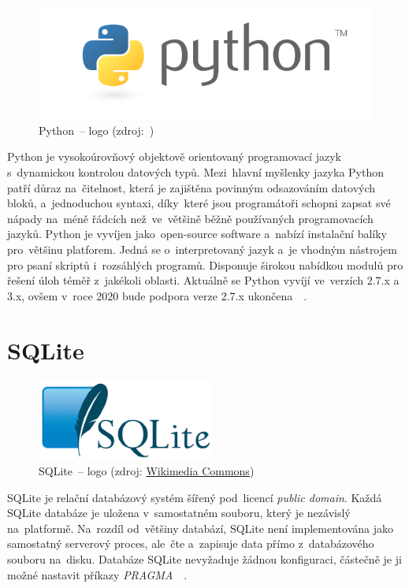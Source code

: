 	\begin{figure}[H]
		\centering
		\includegraphics[width=.5\textwidth]{./pictures/python_logo.png}
      	\caption[Python~– logo]{Python~– logo (zdroj:~\citep{python})}
		\label{fig:python_logo}
 	\end{figure}

Python je vysokoúrovňový objektově orientovaný programovací jazyk s~dynamickou kontrolou datových typů. Mezi~hlavní myšlenky jazyka Python patří důraz na~čitelnost, která je zajištěna povinným odsazováním datových bloků, a~jednoduchou syntaxi, díky~které jsou programátoři schopni zapsat své nápady na~méně řádcích než~ve~většině běžně používaných programovacích jazyků. Python je vyvíjen jako~open-source software a~nabízí instalační balíky pro~většinu platforem. Jedná se o~interpretovaný jazyk a~je vhodným nástrojem pro psaní skriptů i~rozsáhlých programů. Disponuje širokou nabídkou modulů pro řešení úloh téměř z~jakékoli oblasti. Aktuálně se Python vyvíjí ve~verzích 2.7.x a 3.x, ovšem v~roce 2020 bude podpora verze 2.7.x ukončena~\citep{python}~\citep{wiki_python}.

\section{SQLite}
\label{sqlite}

	\begin{figure}[H]
		\centering
		\includegraphics[width=.2\textwidth]{./pictures/sqlite_logo.png}
      	\caption[SQLite~– logo]{SQLite~– logo (zdroj: \href{https://commons.wikimedia.org/wiki/File:SQLite_Logo_4.png}{Wikimedia Commons})}
		\label{fig:sqlite_logo}
 	\end{figure}

SQLite je relační databázový systém šířený pod~licencí \textit{public domain}. Každá SQLite databáze je uložena v~samostatném souboru, který je nezávislý na~platformě. Na~rozdíl od~většiny databází, SQLite není implementována jako samostatný serverový proces, ale~čte a~zapisuje data přímo z~databázového souboru na~disku. Databáze SQLite nevyžaduje žádnou konfiguraci, částečně je ji možné nastavit příkazy \textit{PRAGMA}~\citep{sqlite}~\citep{wiki_sqlite}.

